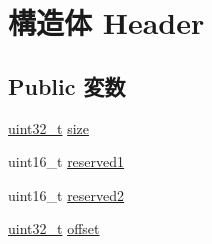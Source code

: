 \hypertarget{structBitmap_1_1Header}{
\section{構造体 Header}
\label{structBitmap_1_1Header}
}
\subsection*{Public 変数}
\begin{DoxyCompactItemize}
\item 
\hyperlink{Type_8hh_a435d1572bf3f880d55459d9805097f62}{uint32\_\-t} \hyperlink{structBitmap_1_1Header_ab2c6b258f02add8fdf4cfc7c371dd772}{size}
\item 
uint16\_\-t \hyperlink{structBitmap_1_1Header_a6b89b86dfe0266be2fc46cf46f6e7b72}{reserved1}
\item 
uint16\_\-t \hyperlink{structBitmap_1_1Header_a0fc429b055e74830a4583ec37f5c3846}{reserved2}
\item 
\hyperlink{Type_8hh_a435d1572bf3f880d55459d9805097f62}{uint32\_\-t} \hyperlink{structBitmap_1_1Header_a894bdfa2d603d8343f8ef01dda6fcd23}{offset}
\end{DoxyCompactItemize}


